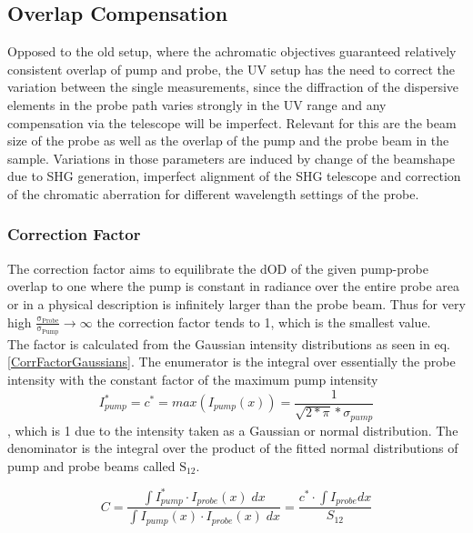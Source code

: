 \documentclass[10pt,a4paper]{article}
\begin{document}
\subsection{Overlap Compensation}
Opposed to the old setup, where the achromatic objectives guaranteed relatively consistent overlap of pump and probe, the UV setup has the need to correct the variation between the single measurements, since the diffraction of the dispersive elements in the probe path varies strongly in the UV range and any compensation via the telescope will be imperfect.\newline
Relevant for this are the beam size of the probe as well as the overlap of the pump and the probe beam in the sample. Variations in those parameters are induced by change of the beamshape due to SHG generation, imperfect alignment of the SHG telescope and correction of the chromatic aberration for different wavelength settings of the probe.\newline

\subsubsection{Correction Factor}
The correction factor aims to equilibrate the dOD of the given pump-probe overlap to one where the pump is constant in radiance over the entire probe area or in a physical description is infinitely larger than the probe beam.
Thus for very high $\mathrm{\frac{\sigma_{Probe}}{\sigma_{Pump}} \rightarrow \infty}$ the correction factor tends to 1, which is the smallest value.\\
The factor is calculated from the Gaussian intensity distributions as seen in eq. \ref{CorrFactorGaussians}. The enumerator is the integral over essentially the probe intensity with the constant factor of the maximum pump intensity 
\begin{equation*}
I_{pump}^* = c^* = max(I_{pump}(x)) = \frac{1}{\sqrt{2*\pi}*\sigma_{pump}}
\end{equation*}, which is 1 due to the intensity taken as a Gaussian or normal distribution. The denominator is the integral over the product of the fitted normal distributions of pump and probe beams called $\mathrm{S_{12}}$.

\begin{equation}\label{CorrFactorGaussians}
C = \dfrac{\int I_{pump}^*\cdot I_{probe}(x) \;dx}{\int I_{pump}(x)\cdot I_{probe}(x) \; dx} = \dfrac{c^*\cdot \int I_{probe} dx}{S_{12}}
\end{equation}
\end{document}
